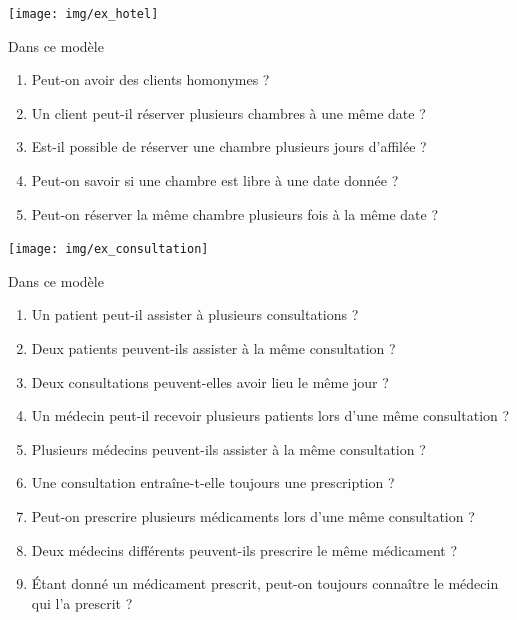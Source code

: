 \documentclass[10pt,firamath,cours]{nsi}
\begin{document}
    \begin{exercice}[]
    \begin{center}
    \texttt{[image: img/ex\_hotel]}
    \end{center}
    Dans ce modèle
    \begin{enumerate}
        \item 	Peut-on avoir des clients homonymes ?
        \item 	Un client peut-il réserver plusieurs chambres à une même date ?
        \item 	Est-il possible de réserver une chambre plusieurs jours d'affilée ?
        \item 	Peut-on savoir si une chambre est libre à une date donnée ?
        \item 	Peut-on réserver la même chambre plusieurs fois à la même date ?
    \end{enumerate}
    \end{exercice}
    \newpage
    \begin{exercice}[]
    \begin{center}
    \texttt{[image: img/ex\_consultation]}
    \end{center}
    Dans ce modèle
    \begin{enumerate}
        \item 	Un patient peut-il assister à plusieurs consultations ?
        \item   Deux patients peuvent-ils assister à la même consultation ?
        \item   Deux consultations peuvent-elles avoir lieu le même jour ?
        \item 	Un médecin peut-il recevoir plusieurs patients lors d'une même consultation ?
        \item   Plusieurs médecins peuvent-ils assister à la même consultation ?
        \item   Une consultation entraîne-t-elle toujours une prescription ?
        \item 	Peut-on prescrire plusieurs médicaments lors d'une même consultation ?
        \item   Deux médecins différents peuvent-ils prescrire le même médicament ?
        \item   \'Etant donné un médicament prescrit, peut-on toujours connaître le médecin qui l'a prescrit ?
    
    \end{enumerate}
    \end{exercice}
    
\end{document}
